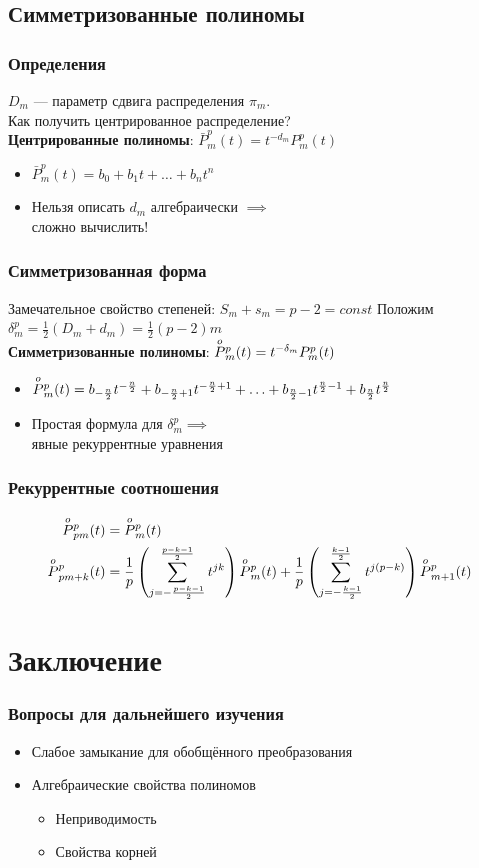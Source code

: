 \subsection{Симметризованные полиномы}
\begin{frame}
\frametitle{Определения}
$D_m$ --- параметр сдвига распределения $\pi_m$.\\
Как получить центрированное распределение?
\bigskip\\
\textbf{Центрированные полиномы}: $\bar{P}_m^p(t) = t^{-d_m}P_m^p(t)$
\begin{itemize}
\item $\bar{P}_m^p(t) = b_0 + b_1 t + \ldots + b_n t^n$
\item Нельзя описать $d_m$ алгебраически $\implies$ \\сложно вычислить!
\end{itemize}
\end{frame}

\begin{frame}
\frametitle{Симметризованная форма}
Замечательное свойство степеней: $S_m + s_m = p-2 = const$
Положим $\delta_m^p = \frac{1}{2}(D_m + d_m) = \frac{1}{2}(p-2)m$
\bigskip\\
\textbf{Симметризованные полиномы}: $\overset{o}{P}{}^{p}_{m}(t) = t^{-\delta_m}P_m^p(t)$
\begin{itemize}
\item $\overset{o}{P}{}^{p}_{m}(t) = b_{-\frac{n}{2}}t^{-\frac{n}{2}} + b_{-\frac{n}{2}+1} t^{-\frac{n}{2} + 1} + \ldots + b_{\frac{n}{2}-1} t^{\frac{n}{2} - 1} + b_{\frac{n}{2}}t^{\frac{n}{2}}$
\item Простая формула для $\delta_m^p \implies$\\
явные рекуррентные уравнения
\end{itemize}
\end{frame}

\begin{frame}
\frametitle{Рекуррентные соотношения}
\begin{align*}
    \overset{o}{P}{}^{p}_{pm}(t)&=\overset{o}{P}{}^{p}_{m}(t)\\
    \overset{o}{P}{}^{p}_{pm+k}(t)&=\frac{1}{p}\left(\sum\limits_{j=-\frac{p-k-1}{2}}^{\frac{p-k-1}{2}} t^{jk}\right)\overset{o}{P}{}^{p}_{m}(t)+\frac{1}{p}\left(\sum\limits_{j=-\frac{k-1}{2}}^\frac{k-1}{2} t^{j(p-k)}\right)\overset{o}{P}{}^{p}_{m+1}(t)
\end{align*}
\end{frame}

\section*{Заключение}
\begin{frame}
\frametitle{Вопросы для дальнейшего изучения}
\begin{itemize}
\item Слабое замыкание для обобщённого преобразования
\item Алгебраические свойства полиномов
\begin{itemize}
\item Неприводимость
\item Свойства корней
\end{itemize}
\end{itemize}
\end{frame}